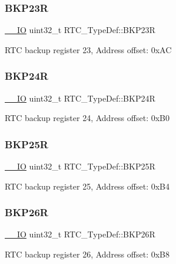 \subsubsection{\texorpdfstring{BKP23R}{BKP23R}}
{\footnotesize\ttfamily \mbox{\hyperlink{core__sc300_8h_aec43007d9998a0a0e01faede4133d6be}{\+\_\+\+\_\+\+IO}} uint32\+\_\+t R\+T\+C\+\_\+\+Type\+Def\+::\+B\+K\+P23R}

R\+TC backup register 23, Address offset\+: 0x\+AC \mbox{\label{struct_r_t_c___type_def_abfe68a89c3a7c2620bb0f286d3f58eea}} 
\subsubsection{\texorpdfstring{BKP24R}{BKP24R}}
{\footnotesize\ttfamily \mbox{\hyperlink{core__sc300_8h_aec43007d9998a0a0e01faede4133d6be}{\+\_\+\+\_\+\+IO}} uint32\+\_\+t R\+T\+C\+\_\+\+Type\+Def\+::\+B\+K\+P24R}

R\+TC backup register 24, Address offset\+: 0x\+B0 \mbox{\label{struct_r_t_c___type_def_a052e275100e4b202808fa4bbe9d5515d}} 
\subsubsection{\texorpdfstring{BKP25R}{BKP25R}}
{\footnotesize\ttfamily \mbox{\hyperlink{core__sc300_8h_aec43007d9998a0a0e01faede4133d6be}{\+\_\+\+\_\+\+IO}} uint32\+\_\+t R\+T\+C\+\_\+\+Type\+Def\+::\+B\+K\+P25R}

R\+TC backup register 25, Address offset\+: 0x\+B4 \mbox{\label{struct_r_t_c___type_def_aaa12210df2df47a6276270a2b7b2d038}} 
\subsubsection{\texorpdfstring{BKP26R}{BKP26R}}
{\footnotesize\ttfamily \mbox{\hyperlink{core__sc300_8h_aec43007d9998a0a0e01faede4133d6be}{\+\_\+\+\_\+\+IO}} uint32\+\_\+t R\+T\+C\+\_\+\+Type\+Def\+::\+B\+K\+P26R}

R\+TC backup register 26, Address offset\+: 0x\+B8 \mbox{\label{struct_r_t_c___type_def_a5879b0d3796b1c291f64dbaa57653624}} 
